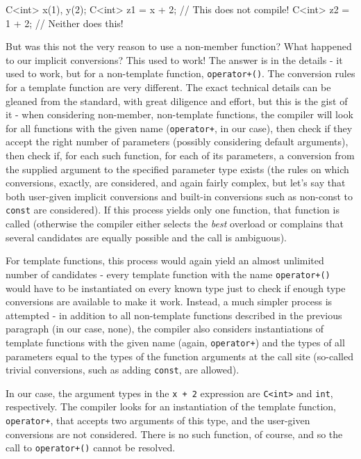 \begin{code}
C<int> x(1), y(2);
C<int> z1 = x + 2; // This does not compile!
C<int> z2 = 1 + 2; // Neither does this!
\end{code}

But was this not the very reason to use a non-member function? What happened to our implicit conversions? This used to work! The answer is in the details - it used to work, but for a non-template function, \texttt{operator+()}. The conversion rules for a template function are very different. The exact technical details can be gleaned from the standard, with great diligence and effort, but this is the gist of it - when considering non-member, non-template functions, the compiler will look for all functions with the given name (\texttt{operator+}, in our case), then check if they accept the right number of parameters (possibly considering default arguments), then check if, for each such function, for each of its parameters, a conversion from the supplied argument to the specified parameter type exists (the rules on which conversions, exactly, are considered, and again fairly complex, but let's say that both user-given implicit conversions and built-in conversions such as non-const to \texttt{const} are considered). If this process yields only one function, that function is called (otherwise the compiler either selects the \emph{best} overload or complains that several candidates are equally possible and the call is ambiguous).

For template functions, this process would again yield an almost unlimited number of candidates - every template function with the name \texttt{operator+()} would have to be instantiated on every known type just to check if enough type conversions are available to make it work. Instead, a much simpler process is attempted - in addition to all non-template functions described in the previous paragraph (in our case, none), the compiler also considers instantiations of template functions with the given name (again, \texttt{operator+}) and the types of all parameters equal to the types of the function arguments at the call site (so-called trivial conversions, such as adding \texttt{const}, are allowed).

In our case, the argument types in the \texttt{x\ +\ 2} expression are \texttt{C\textless{}int\textgreater{}} and \texttt{int}, respectively. The compiler looks for an instantiation of the template function, \texttt{operator+}, that accepts two arguments of this type, and the user-given conversions are not considered. There is no such function, of course, and so the call to \texttt{operator+()} cannot be resolved.

